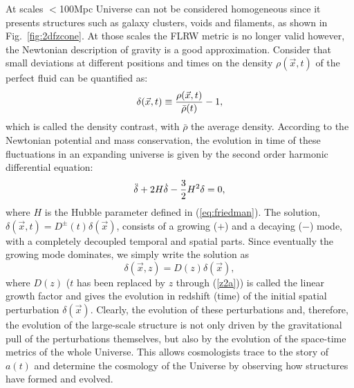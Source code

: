At scales $<$100Mpc Universe can not be considered homogeneous since it presents structures such as galaxy clusters, voids and filaments, as shown in Fig.~\ref{fig:2dfzcone}. At those scales the FLRW metric is no longer valid however, the Newtonian description of gravity is a good approximation. Consider that small deviations at different positions and times on the density $\rho(\vec{x},t)$ of the perfect fluid can be quantified as:
\begin{equation}
\delta(\vec{x}, t) \equiv {\rho(\vec{x},t) \over \bar{\rho}(t)} - 1,
\end{equation}
which is called the density contrast, with $\bar{\rho}$ the average density. According to the Newtonian potential and mass conservation, the evolution in time of these fluctuations in an expanding universe is given by the second order harmonic differential equation:
\begin{equation}
\ddot{\delta} + 2H\dot{\delta} - {3 \over 2}H^2 \delta = 0,
\label{eq:diff_delta}
\end{equation}
where $H$ is the Hubble parameter defined in (\ref{eq:friedman}). The solution, $\delta(\vec{x},t) = D^{\pm}(t)\delta(\vec{x})$, consists of a growing ($+$) and a decaying ($-$) mode, with a completely decoupled temporal and spatial parts. Since eventually the growing mode dominates, we simply write the solution as 
\begin{equation}
\delta(\vec{x},z) = D(z)\delta(\vec{x}),
\label{eq:growth_factor}
\end{equation}
where $D(z)$ ($t$ has been replaced by $z$ through (\ref{z2a})) is called the linear growth factor and gives the evolution in redshift (time) of the initial spatial perturbation $\delta(\vec{x})$.
Clearly, the evolution of these perturbations and, therefore, the evolution of the large-scale structure is not only driven by the gravitational pull of the perturbations themselves, but also by the evolution of the space-time metrics of the whole Universe. This allows cosmologists trace to the story of $a(t)$ and determine the cosmology of the Universe by observing how structures have formed and evolved.
